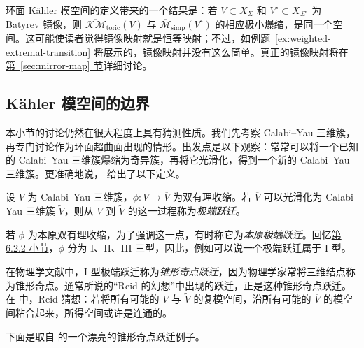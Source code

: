 环面 Kähler 模空间的定义带来的一个结果是：若 $V\subset X_\Sigma$ 和 $V^\circ\subset X_{\Sigma^\circ}$ 为 Batyrev 镜像，则 $\overline{\mathcal{KM}}_{\mathrm{toric}}(V)$ 与 $\overline{\mathcal M}_{\mathrm{simp}}(V^\circ)$ 的相应极小爆缩，是同一个空间。这可能使读者觉得镜像映射就是恒等映射；不过，如例题~\ref{ex:weighted-extremal-transition} 将展示的，镜像映射并没有这么简单。真正的镜像映射将在\hyperref[sec:mirror-map]{第~\ref*{sec:mirror-map} 节}详细讨论。

\hypertarget{source:166-batch4}{}
\subsection{Kähler 模空间的边界}\label{subsec:kahler-moduli-boundary}
本小节的讨论仍然在很大程度上具有猜测性质。我们先考察 Calabi--Yau 三维簇，再专门讨论作为环面超曲面出现的情形。出发点是以下观察：常常可以将一个已知的 Calabi--Yau 三维簇爆缩为奇异簇，再将它光滑化，得到一个新的 Calabi--Yau 三维簇。更准确地说， 给出了以下定义。

\begin{definition}\label{def:extremal-transition}
设 $V$ 为 Calabi--Yau 三维簇，$\phi:V\to\overline V$ 为双有理收缩。若 $\overline V$ 可以光滑化为 Calabi--Yau 三维簇 $\widetilde V$，则从 $V$ 到 $\widetilde V$ 的这一过程称为\emph{极端跃迁}。
\end{definition}

若 $\phi$ 为本原双有理收缩，为了强调这一点，有时称它为\emph{本原极端跃迁}。回忆\hyperref[subsec:threefold-kahler-moduli]{第 6.2.2 小节}，$\phi$ 分为 I、II、III 三型，因此，例如可以说一个极端跃迁属于 I 型。

在物理学文献中，I 型极端跃迁称为\emph{锥形奇点跃迁}，因为物理学家常将三维结点称为锥形奇点。通常所说的“Reid 的幻想”中出现的跃迁，正是这种锥形奇点跃迁。在  中，Reid 猜想：若将所有可能的 $V$ 与 $\widetilde V$ 的复模空间，沿所有可能的 $\overline V$ 的模空间粘合起来，所得空间或许是连通的。

下面是取自  的一个漂亮的锥形奇点跃迁例子。

